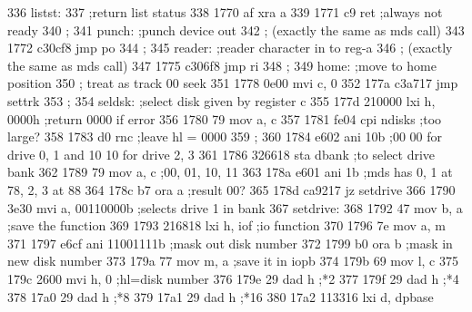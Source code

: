 336                       listst:
337                                ;return list status
338      1770 af                   xra      a
339      1771 c9                   ret                 ;always not ready
340                       ;
341                       punch:   ;punch device out
342                       ;        (exactly the same as mds call)
343      1772 c30cf8               jmp      po
344                       ;
345                       reader:  ;reader character in to reg-a
346                       ;        (exactly the same as mds call)
347      1775 c306f8               jmp      ri
348                       ;
349                       home:    ;move to home position
350                       ;        treat as track 00 seek
351      1778 0e00                 mvi      c, 0
352      177a c3a717               jmp      settrk
353                       ;
354                       seldsk:  ;select disk given by register c
355      177d 210000               lxi      h, 0000h   ;return 0000 if error
356      1780 79                   mov      a, c
357      1781 fe04                 cpi      ndisks     ;too large?
358      1783 d0                   rnc                 ;leave hl = 0000
359                       ;
360      1784 e602                 ani      10b        ;00 00 for drive 0, 1 and 10 10 for drive 2, 3
361      1786 326618               sta      dbank      ;to select drive bank
362      1789 79                   mov      a, c       ;00, 01, 10, 11
363      178a e601                 ani      1b         ;mds has 0, 1 at 78, 2, 3 at 88
364      178c b7                   ora      a          ;result 00?
365      178d ca9217               jz       setdrive
366      1790 3e30                 mvi      a, 00110000b     ;selects drive 1 in bank
367                       setdrive:
368      1792 47                   mov      b, a       ;save the function
369      1793 216818               lxi      h, iof     ;io function
370      1796 7e                   mov      a, m
371      1797 e6cf                 ani      11001111b  ;mask out disk number
372      1799 b0                   ora      b          ;mask in new disk number
373      179a 77                   mov      m, a       ;save it in iopb
374      179b 69                   mov      l, c 
375      179c 2600                 mvi      h, 0       ;hl=disk number
376      179e 29                   dad      h          ;*2
377      179f 29                   dad      h          ;*4
378      17a0 29                   dad      h          ;*8
379      17a1 29                   dad      h          ;*16
380      17a2 113316               lxi      d, dpbase
